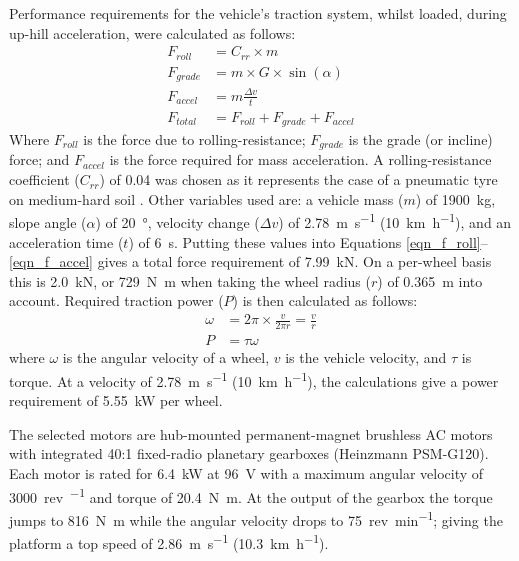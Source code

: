 \documentclass[preprint,authoryear,12pt]{elsarticle}
\begin{document}
        Performance requirements for the vehicle's traction system, whilst loaded, during up-hill acceleration, were calculated as follows:
        \begin{align}
        \label{eqn_f_roll}
        F_{roll} &= C_{rr} \times m\\
        F_{grade} &= m \times G \times \sin(\alpha)\\
        F_{accel} &= m \frac{\Delta v}{t}\\
        \label{eqn_f_accel}
        F_{total} &= F_{roll} + F_{grade} + F_{accel}
        \end{align}
        Where $F_{roll}$ is the force due to rolling-resistance; $F_{grade}$ is the grade (or incline) force; and $F_{accel}$ is the force required for mass acceleration.
        A rolling-resistance coefficient ($C_{rr}$) of 0.04 was chosen as it represents the case of a pneumatic tyre on medium-hard soil \citep{RobertBoschGmbH2002}.
        Other variables used are: a vehicle mass ($m$) of \SI{1900}{\kilo\gram}, slope angle ($\alpha$) of \SI{20}{\degree}, velocity change ($\Delta v$) of \SI{2.78}{\metre\per\second} (\SI{10}{\kilo\meter\per\hour}), and an acceleration time ($t$) of \SI{6}{\second}.
        Putting these values into Equations \ref{eqn_f_roll}--\ref{eqn_f_accel} gives a total force requirement of \SI{7.99}{\kilo\newton}.
        On a per-wheel basis this is \SI{2.0}{\kilo\newton}, or \SI{729}{\newton\meter} when taking the wheel radius ($r$) of \SI{0.365}{\meter} into account.
        Required traction power ($P$) is then calculated as follows:
        \begin{align}
        \label{eqn_f_power}
        \omega &= 2 \pi \times \frac{v}{2 \pi r} = \frac{v}{r}\\
        P &= \tau \omega
        \end{align}
        where $\omega$ is the angular velocity of a wheel, $v$ is the vehicle velocity, and $\tau$ is torque.
        At a velocity of \SI{2.78}{\meter\per\second} (\SI{10}{\kilo\meter\per\hour}), the calculations give a power requirement of \SI{5.55}{\kilo\watt} per wheel.

        The selected motors are hub-mounted permanent-magnet brushless AC motors with integrated 40:1 fixed-radio planetary gearboxes (Heinzmann PSM-G120).
        Each motor is rated for \SI{6.4}{\kilo\watt} at \SI{96}{\volt} with a maximum angular velocity of \SI{3000}{rev\per\min} and torque of \SI{20.4}{\newton\meter}.
        At the output of the gearbox the torque jumps to \SI{816}{\newton\meter} while the angular velocity drops to \SI{75}{rev\per\minute}; giving the platform a top speed of \SI{2.86}{\meter\per\second} (\SI{10.3}{\kilo\meter\per\hour}).
\end{document}
